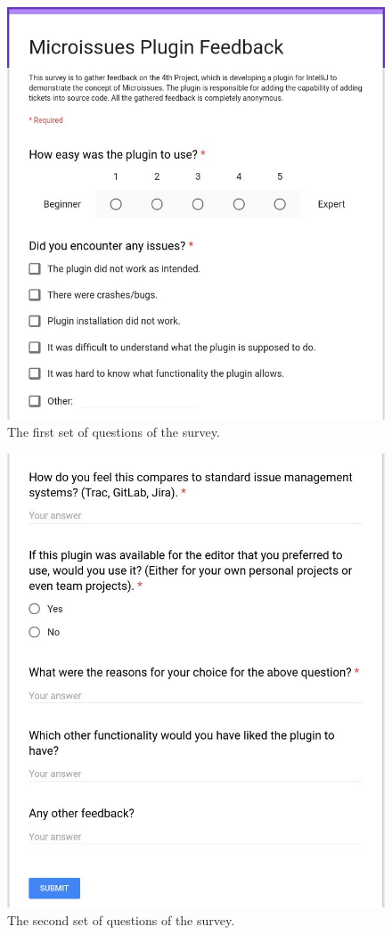 \documentclass{4thYearProject}
\begin{document}
\begin{appendices}
\begin{figure}
\includegraphics[scale=0.5]{Survey_1}
\centering
\caption{The first set of questions of the survey.}
\label{fig:survey1}
\end{figure}

\begin{figure}
\includegraphics[scale=0.5]{Survey_2}
\centering
\caption{The second set of questions of the survey.}
\label{fig:survey2}
\end{figure}


\end{appendices}
\end{document}
